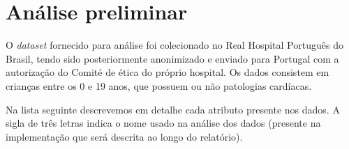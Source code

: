 \documentclass[10pt, conference, compsocconf]{IEEEtran}
\begin{document}

\section{Análise preliminar}
\label{sec:apr}

O \textit{dataset} fornecido para análise foi colecionado no Real
Hospital Português do Brasil, tendo sido posteriormente anonimizado e
enviado para Portugal com a autorização do Comité de ética do próprio
hospital. Os dados consistem em crianças entre os 0 e 19 anos, que
possuem ou não patologias cardíacas.

Na lista seguinte descrevemos em detalhe cada atributo presente nos
dados. A sigla de três letras indica o nome usado na análise dos dados
(presente na implementação que será descrita ao longo do relatório).
\end{document}
